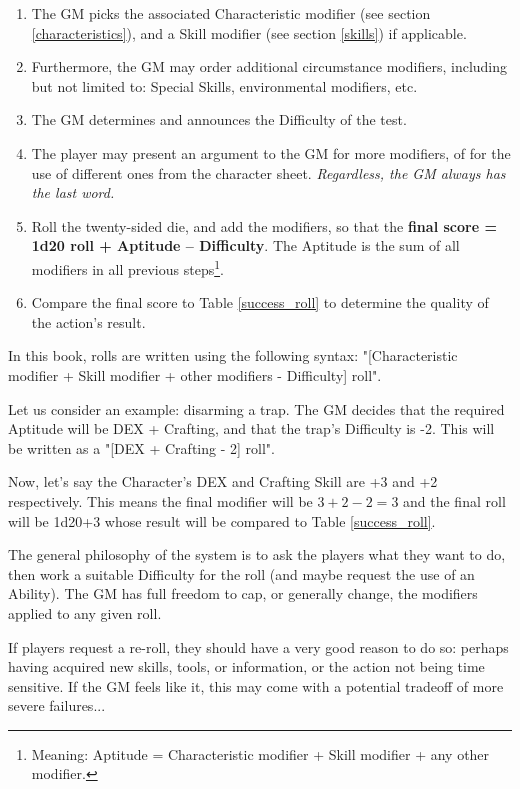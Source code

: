 \begin{enumerate}
    \item The GM picks the associated Characteristic modifier (see section \ref{characteristics}), and a Skill modifier (see section \ref{skills}) if applicable. 
    \item Furthermore, the GM may order additional circumstance modifiers, including but not limited to: Special Skills, environmental modifiers, etc.
	\item The GM determines and announces the Difficulty of the test.
    \item The player may present an argument to the GM for more modifiers, of for the use of different ones from the character sheet. \textit{Regardless, the GM always has the last word.}
    \item Roll the twenty-sided die, and add the modifiers, so that the \textbf{final score = 1d20 roll + Aptitude – Difficulty}. The Aptitude is the sum of all modifiers in all previous steps\footnote{Meaning: Aptitude = Characteristic modifier + Skill modifier + any other modifier.}.
    \item Compare the final score to Table \ref{success_roll} to determine the quality of the action's result.
\end{enumerate}


\begin{rpg-examplebox}
	In this book, rolls are written using the following syntax: "[Characteristic modifier + Skill modifier + other modifiers - Difficulty] roll".
\end{rpg-examplebox}


Let us consider an example: disarming a trap. The GM decides that the required Aptitude will be DEX + Crafting, and that the trap's Difficulty is -2. This will be written as a "[DEX + Crafting - 2] roll".

Now, let's say the Character's DEX and Crafting Skill are +3 and +2 respectively. This means the final modifier will be $3+2-2=3$ and the final roll will be 1d20+3 whose result will be compared to Table \ref{success_roll}.

The general philosophy of the system is to ask the players what they want to do, then work a suitable Difficulty for the roll (and maybe request the use of an Ability). The GM has full freedom to cap, or generally change, the modifiers applied to any given roll.

If players request a re-roll, they should have a very good reason to do so: perhaps having acquired new skills, tools, or information, or the action not being time sensitive. If the GM feels like it, this may come with a potential tradeoff of more severe failures...


